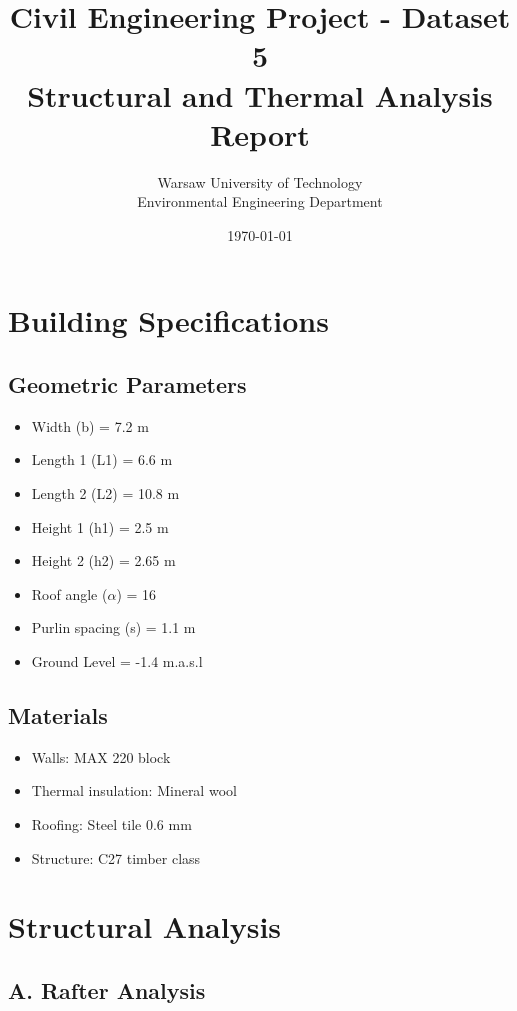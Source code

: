\documentclass[12pt,a4paper]{article}
\begin{document}
\title{Civil Engineering Project - Dataset 5\\
Structural and Thermal Analysis Report}
\author{Warsaw University of Technology\\
Environmental Engineering Department}
\date{\today}

\maketitle
\thispagestyle{fancy}

\section{Building Specifications}
\subsection{Geometric Parameters}
\begin{itemize}
    \item Width (b) = 7.2 m
    \item Length 1 (L1) = 6.6 m
    \item Length 2 (L2) = 10.8 m
    \item Height 1 (h1) = 2.5 m
    \item Height 2 (h2) = 2.65 m
    \item Roof angle ($\alpha$) = 16\degree
    \item Purlin spacing (s) = 1.1 m
    \item Ground Level = -1.4 m.a.s.l
\end{itemize}

\subsection{Materials}
\begin{itemize}
    \item Walls: MAX 220 block
    \item Thermal insulation: Mineral wool
    \item Roofing: Steel tile 0.6 mm
    \item Structure: C27 timber class
\end{itemize}

\section{Structural Analysis}

\subsection{A. Rafter Analysis}
\end{document}
